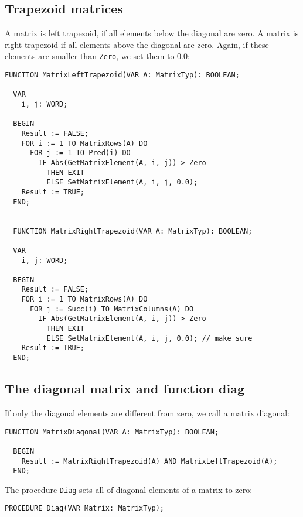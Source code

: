 \begin{refsection}
\subsection{Trapezoid matrices}

A matrix is left trapezoid, if all elements below the diagonal are zero. A matrix is right trapezoid if all elements above the diagonal are zero. Again, if these elements are smaller than \texttt{Zero}, we set them to 0.0:


 \begin{lstlisting}[caption=is matrix left trapezoid]
  FUNCTION MatrixLeftTrapezoid(VAR A: MatrixTyp): BOOLEAN;

  VAR
    i, j: WORD;

  BEGIN
    Result := FALSE;
    FOR i := 1 TO MatrixRows(A) DO
      FOR j := 1 TO Pred(i) DO
        IF Abs(GetMatrixElement(A, i, j)) > Zero
          THEN EXIT
          ELSE SetMatrixElement(A, i, j, 0.0);
    Result := TRUE;
  END;


  FUNCTION MatrixRightTrapezoid(VAR A: MatrixTyp): BOOLEAN;

  VAR
    i, j: WORD;

  BEGIN
    Result := FALSE;
    FOR i := 1 TO MatrixRows(A) DO
      FOR j := Succ(i) TO MatrixColumns(A) DO
        IF Abs(GetMatrixElement(A, i, j)) > Zero
          THEN EXIT
          ELSE SetMatrixElement(A, i, j, 0.0); // make sure
    Result := TRUE;
  END;
\end{lstlisting}

\subsection{The diagonal matrix and function diag}

If only the diagonal elements are different from zero, we call a matrix diagonal:

\begin{lstlisting}[caption=is matrix  diagonal]
  FUNCTION MatrixDiagonal(VAR A: MatrixTyp): BOOLEAN;

  BEGIN
    Result := MatrixRightTrapezoid(A) AND MatrixLeftTrapezoid(A);
  END;
\end{lstlisting}

The procedure \texttt{Diag} sets all of-diagonal elements of a matrix to zero:

\begin{lstlisting}[caption=set all of-diagonal elements to zero]
  PROCEDURE Diag(VAR Matrix: MatrixTyp);


\end{lstlisting}
\end{refsection}
